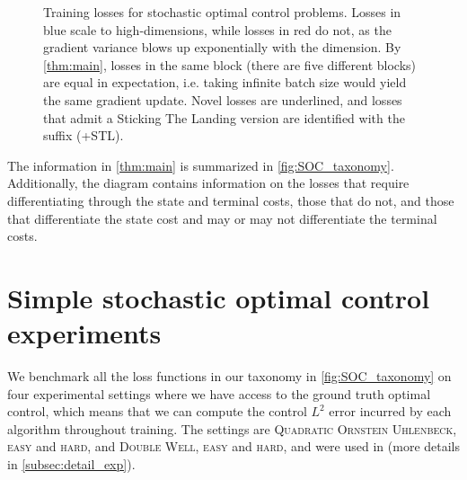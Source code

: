 \documentclass[]{fairmeta}
\begin{document}
\begin{figure}[h]

\caption{Training losses for stochastic optimal control problems. Losses in blue scale to high-dimensions, while losses in red do not, as the gradient variance blows up exponentially with the dimension. By \autoref{thm:main}, losses in the same block (there are five different blocks) are equal in expectation, i.e. taking infinite batch size would yield the same gradient update. Novel losses are underlined, and losses that admit a Sticking The Landing version are identified with the suffix (+STL).}
\label{fig:SOC_taxonomy}
\end{figure}

The information in \autoref{thm:main} is summarized in \autoref{fig:SOC_taxonomy}. Additionally, the diagram contains information on the losses that require differentiating through the state and terminal costs, those that do not, and those that differentiate the state cost and may or may not differentiate the terminal costs. 

\section{Simple stochastic optimal control experiments} \label{sec:simple_exp}

We benchmark all the loss functions in our taxonomy in \autoref{fig:SOC_taxonomy} on four experimental settings where we have access to the ground truth optimal control, which means that we can compute the control $L^2$ error incurred by each algorithm throughout training. The settings are \textsc{Quadratic Ornstein Uhlenbeck, easy} and \textsc{hard}, and \textsc{Double Well, easy} and \textsc{hard}, and were used in \cite{domingoenrich2023stochastic,nüsken2023solving} (more details in \autoref{subsec:detail_exp}). 
\end{document}
